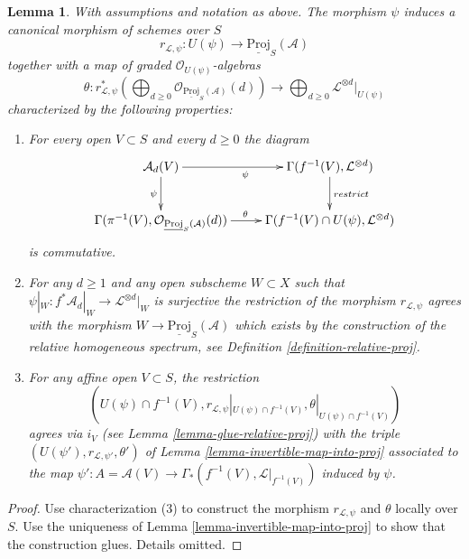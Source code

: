 \documentclass{stacks-project}
\theoremstyle{plain}
\newtheorem{lemma}[subsection]{Lemma}
\theoremstyle{definition}
\theoremstyle{remark}
\numberwithin{equation}{subsection}
\begin{document}
\begin{lemma}
\label{lemma-invertible-map-into-relative-proj}
With assumptions and notation as above. The morphism
$\psi$ induces a canonical morphism of schemes over $S$
$$
r_{\mathcal{L}, \psi} :
U(\psi) \longrightarrow \underline{\text{Proj}}_S(\mathcal{A})
$$
together with a map of graded $\mathcal{O}_{U(\psi)}$-algebras
$$
\theta :
r_{\mathcal{L}, \psi}^*\left(
\bigoplus\nolimits_{d \geq 0}
\mathcal{O}_{\underline{\text{Proj}}_S(\mathcal{A})}(d)
\right)
\longrightarrow
\bigoplus\nolimits_{d \geq 0} \mathcal{L}^{\otimes d}|_{U(\psi)}
$$
characterized by the following properties:
\begin{enumerate}
\item For every open $V \subset S$ and every $d \geq 0$ the diagram
$$
\xymatrix{
\mathcal{A}_d(V) \ar[d]_{\psi} \ar[r]_{\psi} &
\Gamma(f^{-1}(V), \mathcal{L}^{\otimes d}) \ar[d]^{restrict} \\
\Gamma(\pi^{-1}(V),
\mathcal{O}_{\underline{\text{Proj}}_S(\mathcal{A})}(d)) \ar[r]^{\theta} &
\Gamma(f^{-1}(V) \cap U(\psi), \mathcal{L}^{\otimes d})
}
$$
is commutative.
\item For any $d \geq 1$ and any open subscheme $W \subset X$
such that $\psi|_W : f^*\mathcal{A}_d|_W \to \mathcal{L}^{\otimes d}|_W$
is surjective the restriction of the morphism $r_{\mathcal{L}, \psi}$
agrees with the morphism $W \to \underline{\text{Proj}}_S(\mathcal{A})$
which exists by the construction of the relative homogeneous spectrum,
see Definition \ref{definition-relative-proj}.
\item For any affine open $V \subset S$, the restriction
$$
(U(\psi) \cap f^{-1}(V), r_{\mathcal{L}, \psi}|_{U(\psi) \cap f^{-1}(V)},
\theta|_{U(\psi) \cap f^{-1}(V)})
$$
agrees via $i_V$ (see Lemma \ref{lemma-glue-relative-proj}) with the triple
$(U(\psi'), r_{\mathcal{L}, \psi'}, \theta')$
of Lemma \ref{lemma-invertible-map-into-proj} associated to the map
$\psi' : A = \mathcal{A}(V) \to \Gamma_*(f^{-1}(V), \mathcal{L}|_{f^{-1}(V)})$
induced by $\psi$.
\end{enumerate}
\end{lemma}

\begin{proof}
Use characterization (3) to construct the morphism $r_{\mathcal{L}, \psi}$
and $\theta$ locally over $S$. Use the uniqueness of
Lemma \ref{lemma-invertible-map-into-proj}
to show that the construction glues. Details omitted.
\end{proof}
\end{document}
